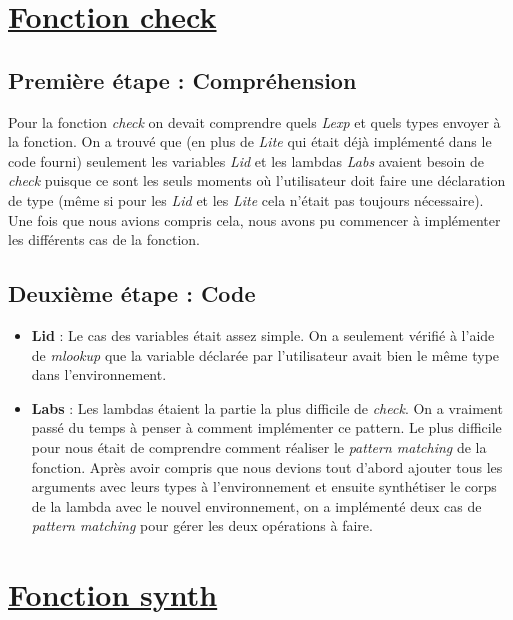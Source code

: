 \documentclass{article}
\begin{document}

\section{\underline{Fonction check}}

\subsection{Première étape : Compréhension}

Pour la fonction \textit{check} on devait comprendre quels \textit{Lexp} et quels types envoyer à la fonction. On a trouvé que (en plus de \textit{Lite} qui était déjà implémenté dans le code fourni) seulement les variables \textit{Lid} et les lambdas \textit{Labs} avaient besoin de \textit{check} puisque ce sont les seuls moments où l'utilisateur doit faire une déclaration de type (même si pour les \textit{Lid} et les \textit{Lite} cela n'était pas toujours nécessaire). Une fois que nous avions compris cela, nous avons pu commencer à implémenter les différents cas de la fonction.


\subsection{Deuxième étape : Code}
 
\begin{itemize}
    \item \textbf{Lid} : Le cas des variables était assez simple. On a seulement vérifié à l'aide de \textit{mlookup} que la variable déclarée par l'utilisateur avait bien le même type dans l'environnement.
    \item \textbf{Labs} : Les lambdas étaient la partie la plus difficile de \textit{check}. On a vraiment passé du temps à penser à comment implémenter ce pattern. Le plus difficile pour nous était de comprendre comment réaliser le \textit{pattern matching} de la fonction. Après avoir compris que nous devions tout d'abord ajouter tous les arguments avec leurs types à l'environnement et ensuite synthétiser le corps de la lambda avec le nouvel environnement, on a implémenté deux cas de \textit{pattern matching} pour gérer les deux opérations à faire. 
\end{itemize}




\section{\underline{Fonction synth}}
\end{document}
